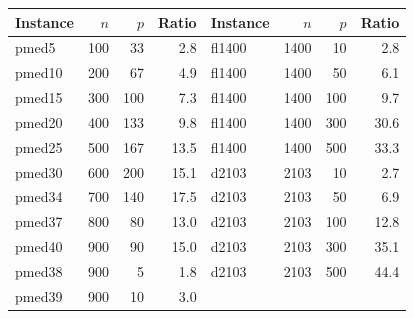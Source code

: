\begin{tabular}{lrrr@{\hskip 18pt}lrrr}
\toprule
Instance & $n$ & $p$ & Ratio & Instance & $n$ & $p$ & Ratio \\
\midrule
pmed5 & 100 & 33 & 2.8 & fl1400 & 1400 & 10 & 2.8 \\
pmed10 & 200 & 67 & 4.9 & fl1400 & 1400 & 50 & 6.1 \\
pmed15 & 300 & 100 & 7.3 & fl1400 & 1400 & 100 & 9.7 \\
pmed20 & 400 & 133 & 9.8 & fl1400 & 1400 & 300 & 30.6 \\
pmed25 & 500 & 167 & 13.5 & fl1400 & 1400 & 500 & 33.3 \\
pmed30 & 600 & 200 & 15.1 & d2103 & 2103 & 10 & 2.7 \\
pmed34 & 700 & 140 & 17.5 & d2103 & 2103 & 50 & 6.9 \\
pmed37 & 800 & 80 & 13.0 & d2103 & 2103 & 100 & 12.8 \\
pmed40 & 900 & 90 & 15.0 & d2103 & 2103 & 300 & 35.1 \\
pmed38 & 900 & 5 & 1.8 & d2103 & 2103 & 500 & 44.4 \\
pmed39 & 900 & 10 & 3.0 &  & & &  \\
\bottomrule
\end{tabular}